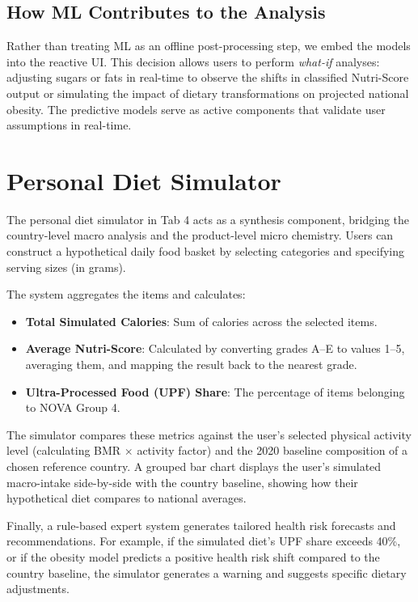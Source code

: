 \documentclass[10pt, a4paper]{article}
\begin{document}
\subsection{How ML Contributes to the Analysis}
Rather than treating ML as an offline post-processing step, we embed the models into the reactive UI. This decision allows users to perform \textit{what-if} analyses: adjusting sugars or fats in real-time to observe the shifts in classified Nutri-Score output or simulating the impact of dietary transformations on projected national obesity. The predictive models serve as active components that validate user assumptions in real-time.

\section{Personal Diet Simulator}
\label{sec:simulator}

The personal diet simulator in Tab 4 acts as a synthesis component, bridging the country-level macro analysis and the product-level micro chemistry. Users can construct a hypothetical daily food basket by selecting categories and specifying serving sizes (in grams).

The system aggregates the items and calculates:
\begin{itemize}[nosep, leftmargin=1.5em]
    \item \textbf{Total Simulated Calories}: Sum of calories across the selected items.
    \item \textbf{Average Nutri-Score}: Calculated by converting grades A--E to values 1--5, averaging them, and mapping the result back to the nearest grade.
    \item \textbf{Ultra-Processed Food (UPF) Share}: The percentage of items belonging to NOVA Group 4.
\end{itemize}

The simulator compares these metrics against the user's selected physical activity level (calculating BMR $\times$ activity factor) and the 2020 baseline composition of a chosen reference country. A grouped bar chart displays the user's simulated macro-intake side-by-side with the country baseline, showing how their hypothetical diet compares to national averages.

Finally, a rule-based expert system generates tailored health risk forecasts and recommendations. For example, if the simulated diet's UPF share exceeds 40\%, or if the obesity model predicts a positive health risk shift compared to the country baseline, the simulator generates a warning and suggests specific dietary adjustments.
\end{document}

